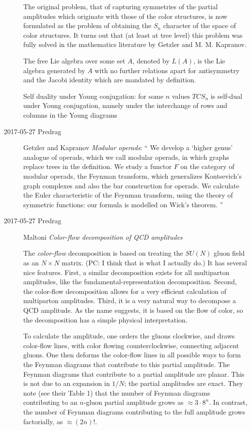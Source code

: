 \begin{description}
The original problem, that of capturing symmetries of the partial
amplitudes which originate with those of the color structures, is now
formulated as the problem of obtaining the $S_n$ character
of the space of color structures. It turns out that (at least at
tree level) this problem was fully solved in the mathematics literature
by Getzler and M. M. Kapranov.

The free Lie algebra over some set $A$, denoted by $L(A)$, is the Lie
algebra generated by $A$ with no further relations apart for antisymmetry
and the Jacobi identity which are mandated by definition.

Self duality under Young conjugation: for some $n$ values $TCS_n$  is
self-dual under Young conjugation, namely under the interchange of rows
and columns in the Young diagrams

\item[2017-05-27 Predrag]
Getzler and Kapranov {\em Modular operads}: ``
We develop a `higher genus' analogue of operads, which we call modular
operads, in which graphs replace trees in the definition. We study a
functor $F$ on the category of modular operads, the Feynman transform,
which generalizes Kontsevich's graph complexes and also the bar
construction for operads. We calculate the Euler characteristic of the
Feynman transform, using the theory of symmetric functions: our formula
is modelled on Wick's theorem.
''

\item[2017-05-27 Predrag]
Maltoni \etal{}
{\em Color-flow decomposition of {QCD} amplitudes}

The \emph{color-flow} decomposition is based on treating the $SU(N)$
gluon field as an $N\!\times\!N$ matrix.
(PC: I think that is what I actually do.)
It has several nice features.
First, a similar decomposition exists for all multiparton amplitudes,
like the fundamental-representation decomposition. Second, the color-flow
decomposition allows for a very efficient calculation of multiparton
amplitudes. Third, it is a very natural way to decompose a QCD amplitude.
As the name suggests, it is based on the flow of color, so the
decomposition has a simple physical interpretation.

To calculate the amplitude, one orders the gluons clockwise, and draws
color-flow lines, with color flowing counterclockwise, connecting
adjacent gluons. One then deforms the color-flow lines in all possible
ways to form the Feynman diagrams that contribute to this partial
amplitude. The Feynman diagrams that contribute to a partial amplitude
are planar. This is not due to an expansion in $1/N$; the partial
amplitudes are exact. They note (see their Table 1) that the number of
Feynman diagrams contributing to an $n$-gluon partial amplitude grows as
$\approx 3 \cdot 8^n$. In contrast, the number of Feynman diagrams
contributing to the full amplitude grows factorially, as
$\approx (2n)!$.



\end{description}
